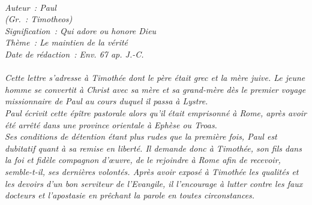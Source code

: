 \BFont
\noindent\hrulefill
{\footnotesize
\textit{
\bigskip
{\centering{}
\\Auteur~: Paul
\\(Gr.~: Timotheos)
\\Signification~: Qui adore ou honore Dieu
\\Thème~: Le maintien de la vérité
\\Date de rédaction~: Env. 67 ap. J.-C.\\}
}
\textit{
\\Cette lettre s'adresse à Timothée dont le père était grec et la mère juive. Le jeune homme se convertit à Christ avec sa mère et sa grand-mère dès le premier voyage missionnaire de Paul au cours duquel il passa à Lystre.
\\Paul écrivit cette épître pastorale alors qu'il était emprisonné à Rome, après avoir été arrêté dans une province orientale à Ephèse ou Troas.
\\Ses conditions de détention étant plus rudes que la première fois, Paul est dubitatif quant à sa remise en liberté. Il demande donc à Timothée, son fils dans la foi et fidèle compagnon d'œuvre, de le rejoindre à Rome afin de recevoir, semble-t-il, ses dernières volontés. Après avoir exposé à Timothée les qualités et les devoirs d'un bon serviteur de l'Evangile, il l'encourage à lutter contre les faux docteurs et l'apostasie en prêchant la parole en toutes circonstances.\bigskip
}
}
\par\nobreak\noindent\hrulefill
